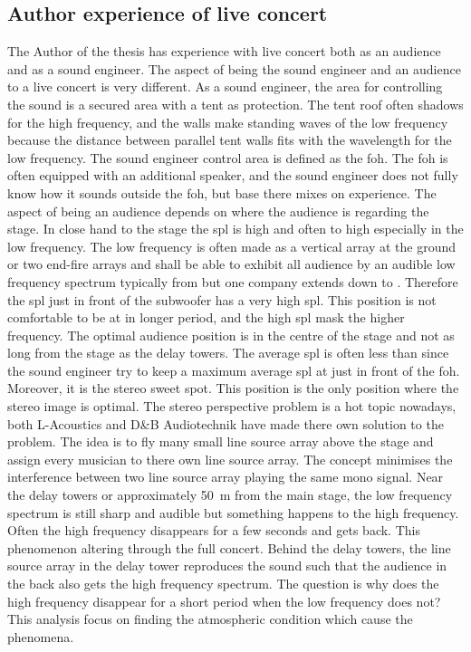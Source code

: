 \subsection{Author experience of live concert}\label{sec:ana:aut_exp_con}
The Author of the thesis has experience with live concert both as an audience and as a sound engineer. The aspect of being the sound engineer and an audience to a live concert is very different. As a sound engineer, the area for controlling the sound is a secured area with a tent as protection. The tent roof often shadows for the high frequency, and the walls make standing waves of the low frequency because the distance between parallel tent walls fits with the wavelength for the low frequency. The sound engineer control area is defined as the \gls{foh}. The \gls{foh} is often equipped with an additional speaker, and the sound engineer does not fully know how it sounds outside the \gls{foh}, but base there mixes on experience. The aspect of being an audience depends on where the audience is regarding the stage. In close hand to the stage the \gls{spl} is high and often to high especially in the low frequency. The low frequency is often made as a vertical array at the ground or two end-fire arrays and shall be able to exhibit all audience by an audible low frequency spectrum typically from  but one company extends down to . Therefore the \gls{spl} just in front of the subwoofer has a very high \gls{spl}. This position is not comfortable to be at in longer period, and the high \gls{spl} mask the higher frequency. The optimal audience position is in the centre of the stage and not as long from the stage as the delay towers. The average \gls{spl} is often less than  since the sound engineer try to keep a maximum average \gls{spl} at  just in front of the \gls{foh}. Moreover, it is the stereo sweet spot. This position is the only position where the stereo image is optimal. The stereo perspective problem is a hot topic nowadays, both L-Acoustics \citep{l_acoustics_l_isa} and D\&B Audiotechnik \citep{dbsoundscape} have made there own solution to the problem. The idea is to fly many small line source array above the stage and assign every musician to there own line source array. The concept minimises the interference between two line source array playing the same mono signal. 
Near the delay towers or approximately \SI{50}{\meter} from the main stage, the low frequency spectrum is still sharp and audible but something happens to the high frequency. Often the high frequency disappears for a few seconds and gets back. This phenomenon altering through the full concert. Behind the delay towers, the line source array in the delay tower reproduces the sound such that the audience in the back also gets the high frequency spectrum. The question is why does the high frequency disappear for a short period when the low frequency does not? This analysis focus on finding the atmospheric condition which cause the phenomena.

 
